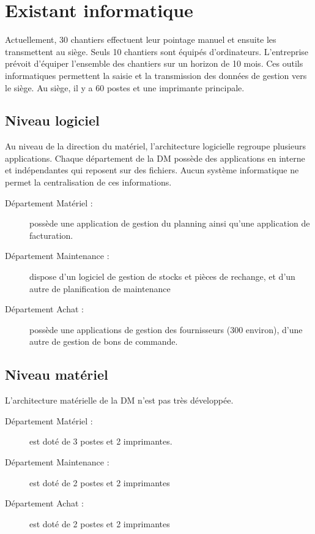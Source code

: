 
\section{Existant informatique}

		Actuellement, 30 chantiers effectuent leur pointage manuel et ensuite les transmettent au siège. Seuls 10
chantiers sont équipés d'ordinateurs. L'entreprise prévoit d'équiper l'ensemble des chantiers sur un horizon de 10 mois. 
Ces outils informatiques permettent la saisie et la transmission des données de gestion vers le siège.
		Au siège, il y a 60 postes et une imprimante principale.
		
		\subsection{Niveau logiciel}
		
		Au niveau de la direction du matériel, l'architecture logicielle regroupe plusieurs applications.
Chaque département de la DM possède des applications en interne et indépendantes qui reposent sur des fichiers. Aucun système informatique
ne permet la centralisation de ces informations.

		\begin{description}
			\item[Département Matériel :] possède une application de gestion du planning ainsi qu'une application de facturation.
			\item[Département Maintenance :] dispose d'un logiciel de gestion de stocks et pièces de rechange, et d'un autre de planification de maintenance
			\item[Département Achat :] possède une applications de gestion des fournisseurs (300 environ), d'une autre de gestion de bons de commande.
		\end{description}


		\subsection{Niveau matériel}

		 L'architecture matérielle de la DM n'est pas très développée.

		\begin{description}
			\item[Département Matériel :] est doté de 3 postes et 2 imprimantes.
			\item[Département Maintenance :] est doté de 2 postes et 2 imprimantes
			\item[Département Achat :] est doté de 2 postes et 2 imprimantes
		\end{description}
		
